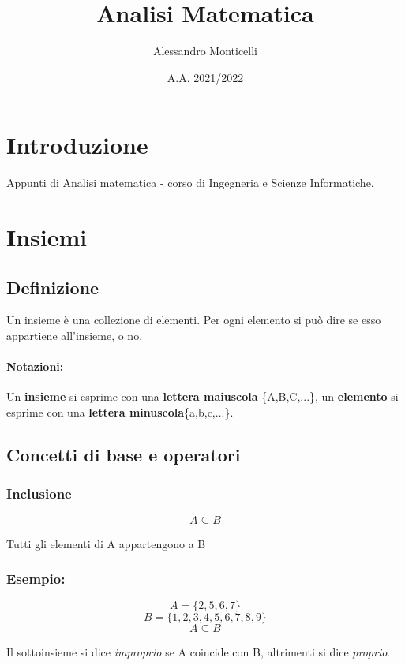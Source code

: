\documentclass{article}
\title{Analisi Matematica}
\author{Alessandro Monticelli}
\date{A.A. 2021/2022}
\begin{document}
  
\maketitle
\newpage
\tableofcontents
\newpage
\section*{Introduzione}
    Appunti di Analisi matematica - corso di Ingegneria e Scienze Informatiche.
\newpage
\section{Insiemi}
    \subsection{Definizione}
        Un insieme è una collezione di elementi. Per ogni elemento si può dire se esso appartiene all'insieme, o no.
    \paragraph{Notazioni:}Un \textbf{insieme} si esprime con una \textbf{lettera maiuscola} \{A,B,C,...\}, 
        un \textbf{elemento} si esprime con una \textbf{lettera minuscola}\{a,b,c,...\}.

    \subsection{Concetti di base e operatori}
    \subsubsection{Inclusione}
        \begin{LARGE}
            \begin{equation*}
                A \subseteq B
            \end{equation*}
        \end{LARGE}
        Tutti gli elementi di A appartengono a B\newline
        
        \subsubsection*{Esempio:}
        
        \begin{LARGE}
            \begin{equation*}
                A = \{2,5,6,7\}
            \end{equation*}
            \begin{equation*}
                B = \{1,2,3,4,5,6,7,8,9\}
            \end{equation*}
            \begin{equation*}
                A \subseteq B
            \end{equation*}
        \end{LARGE}
        Il sottoinsieme si dice \textit{improprio} se A coincide con B, altrimenti si dice \textit{proprio}.
\end{document}
